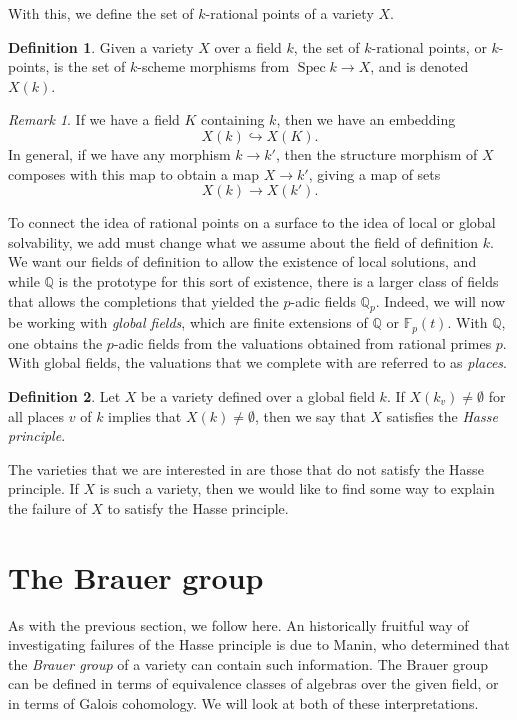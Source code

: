 \documentclass[12pt,twoside]{reedthesis}
\theoremstyle{plain}
\theoremstyle{definition}
\newtheorem{definition}{Definition}[section]
\theoremstyle{remark}
\newtheorem{remark}{Remark}[section]
\newcommand{\QQ}{\mathbb{Q}}
\newcommand{\FF}{\mathbb{F}}
\newcommand{\Spec}{\operatorname{Spec}}
\begin{document}
With this, we define the set of $k$-rational points of a variety $X$.

\begin{definition}
Given a variety $X$ over a field $k$, the set of $k$-rational points, or $k$-points, is the set of $k$-scheme morphisms from $\Spec k\to X$, and is denoted $X(k)$.
\end{definition}
\begin{remark}
If we have a field $K$ containing $k$, then we have an embedding \[X(k)\hookrightarrow X(K).\] In general, if we have any morphism $k\to k'$, then the structure morphism of $X$ composes with this map to obtain a map $X\to k'$, giving a map of sets \[X(k)\to X(k').\]
\end{remark}
To connect the idea of rational points on a surface to the idea of local or global solvability, we add must change what we assume about the field of definition $k$. We want our fields of definition to allow the existence of local solutions, and while $\QQ$ is the prototype for this sort of existence, there is a larger class of fields that allows the completions that yielded the $p$-adic fields $\QQ_p$. Indeed, we will now be working with \emph{global fields}, which are finite extensions of $\QQ$ or $\FF_p(t)$. With $\QQ$, one obtains the $p$-adic fields from the valuations obtained from rational primes $p$. With global fields, the valuations that we complete with are referred to as \emph{places}.
\begin{definition}
Let $X$ be a variety defined over a global field $k$. If $X(k_v)\neq\emptyset$ for all places $v$ of $k$ implies that $X(k)\neq\emptyset$, then we say that $X$ satisfies the \emph{Hasse principle}.
\end{definition}
The varieties that we are interested in are those that do not satisfy the Hasse principle. If $X$ is such a variety, then we would like to find some way to explain the failure of $X$ to satisfy the Hasse principle.
\section{The Brauer group}
As with the previous section, we follow \cite{qPoints} here. An historically fruitful way of investigating failures of the Hasse principle is due to Manin, who determined that the \emph{Brauer group} of a variety can contain such information. The Brauer group can be defined in terms of equivalence classes of algebras over the given field, or in terms of Galois cohomology. We will look at both of these interpretations.
\end{document}

